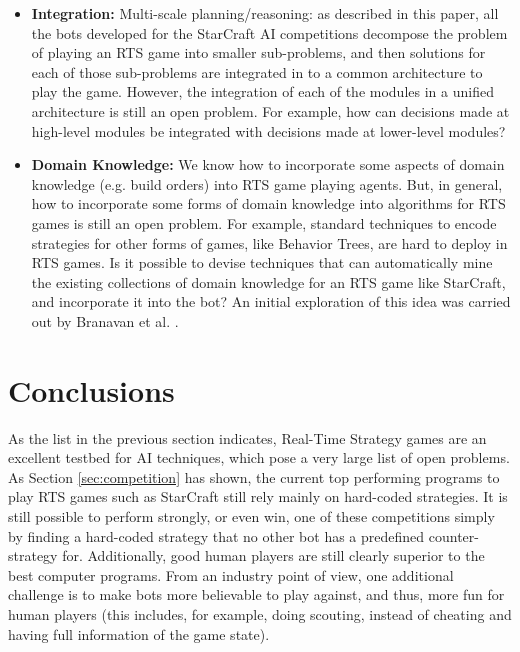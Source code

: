 \documentclass[journal]{IEEEtran}
\begin{document}
\begin{itemize}
\item {\bf Integration:}
Multi-scale planning/reasoning: as described in this paper, all the bots developed for the StarCraft AI competitions decompose the problem of playing an RTS game into smaller sub-problems, and then solutions for each of those sub-problems are integrated in to a common architecture to play the game. However, the integration of each of the modules in a unified architecture is still an open problem. For example, how can decisions made at high-level modules be integrated with decisions made at lower-level modules? 

\item {\bf Domain Knowledge: }
We know how to incorporate some aspects of domain knowledge (e.g. build orders) into RTS game playing agents. But, in general, how to incorporate some forms of domain knowledge into algorithms for RTS games is still an open problem. For example, standard techniques to encode strategies for other forms of games, like Behavior Trees, are hard to deploy in RTS games. Is it possible to devise techniques that can automatically mine the existing collections of domain knowledge for an RTS game like StarCraft, and incorporate it into the bot? An initial exploration of this idea was carried out by Branavan et al. \cite{branavan2011learning}.
\end{itemize}



%

\section{Conclusions}\label{sec:conclusions}

As the list in the previous section indicates, Real-Time Strategy games are an excellent testbed for AI techniques, which pose a very large list of open problems. As Section \ref{sec:competition} has shown, the current top performing programs to play RTS games such as StarCraft still rely mainly on hard-coded strategies. It is still possible to perform strongly, or even win, one of these competitions simply by finding a hard-coded strategy that no other bot has a predefined counter-strategy for. Additionally, good human players are still clearly superior to the best computer programs. From an industry point of view, one additional challenge is to make bots more believable to play against, and thus, more fun for human players (this includes, for example, doing scouting, instead of cheating and having full information of the game state).
\end{document}
